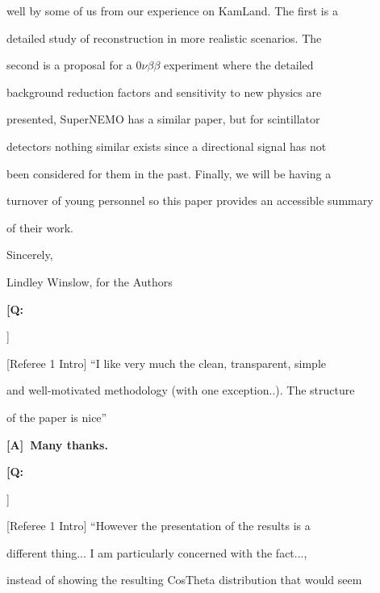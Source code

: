 \documentclass[11pt]{article}
\newcounter{question}
\newcommand{\noteq}{{\vskip0.1in\bf \large \color{red} [Q:{\color{black}\addtocounter{question}{1}\arabic{question}}]~}}
\newcommand{\notea}{{\bf \large \color{red} [A]~}}
\begin{document}
well by some of us from our experience on KamLand. The first is a

detailed study of reconstruction in more realistic scenarios. The

second is a proposal for a $0\nu\beta\beta$ experiment  where the detailed

background reduction factors and sensitivity to new physics are

presented, SuperNEMO has a similar paper, but for scintillator

detectors nothing similar exists since a directional signal has not

been considered for them in the past.  Finally, we will be having a

turnover of young personnel so this paper provides an accessible summary

of their work.





\parindent 3.0in

                

    Sincerely,\\



\parindent 4.0in



		         Lindley Winslow, for the Authors



\parindent 0.0in







\noteq [Referee 1 Intro] ``I like  very much the clean, transparent, simple

and well-motivated methodology (with one exception..). The structure

of the paper is nice''



\notea{\bf Many thanks.}\\





\noteq [Referee 1 Intro] ``However the presentation of the results is a

different thing... I am particularly concerned with the fact...,

instead of showing the resulting CosTheta distribution that would seem
\end{document}

